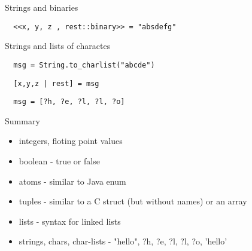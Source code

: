 \begin{frame}[fragile]{Strings and binaries}

\vspace{20pt}  \pause
\begin{verbatim}  
  <<x, y, z , rest::binary>> = "absdefg"
\end{verbatim}  
  
\end{frame}

\begin{frame}[fragile]{Strings and lists of charactes}

\vspace{20pt}  \pause  
\begin{verbatim}
  msg = String.to_charlist("abcde")
\end{verbatim}

\vspace{20pt}  \pause
\begin{verbatim}  
  [x,y,z | rest] = msg
\end{verbatim}

\vspace{20pt}  \pause
\begin{verbatim}  
  msg = [?h, ?e, ?l, ?l, ?o]
\end{verbatim}

\end{frame}

\begin{frame}{Summary}

  \begin{itemize}
  \item integers, floting point values \pause
  \item boolean - true or false
  \item atoms - similar to Java enum \pause
  \item tuples - similar to a C struct (but without names) or an array\pause
  \item lists - syntax for linked lists
  \item strings, chars, char-lists  - "hello", ?h, ?e, ?l, ?l, ?o, 'hello'
  \end{itemize}

\end{frame}




